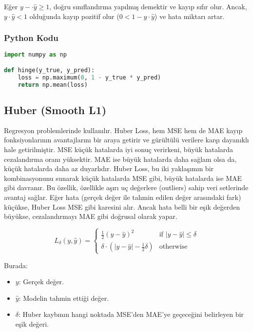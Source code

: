 Eğer $y - \cdot \hat{y} \geq 1$, doğru sınıflandırma yapılmış demektir ve kayıp sıfır olur. Ancak, $y \cdot \hat{y} < 1$ olduğunda kayıp pozitif olur ($0 < 1 - y \cdot \hat{y}$) ve hata miktarı artar.

\subsubsection{Python Kodu}

\begin{lstlisting}[language=Python]
import numpy as np

def hinge(y_true, y_pred):
    loss = np.maximum(0, 1 - y_true * y_pred)
    return np.mean(loss)
\end{lstlisting}

\newpage

\subsection{Huber (Smooth L1)}

Regresyon problemlerinde kullanılır. Huber Loss, hem MSE hem de MAE kayıp fonksiyonlarının avantajlarını bir araya getirir ve gürültülü verilere karşı dayanıklı hale getirilmiştir. MSE küçük hatalarda iyi sonuç verirkeni, büyük hatalarda cezalandırma oranı yüksektir. MAE ise büyük hatalarda daha sağlam olsa da, küçük hatalarda daha az duyarlıdır. Huber Loss, bu iki yaklaşımın bir kombinasyonunu sunarak küçük hatalarda MSE gibi, büyük hatalarda ise MAE gibi davranır. Bu özellik, özellikle aşırı uç değerlere (outliers) sahip veri setlerinde avantaj sağlar. Eğer hata (gerçek değer ile tahmin edilen değer arasındaki fark) küçükse, Huber Loss MSE gibi karesini alır. Ancak hata belli bir eşik değerden büyükse, cezalandırmayı MAE gibi doğrusal olarak yapar.

\[
L_{\delta}(y, \hat{y}) =
\begin{cases}
    \frac{1}{2} (y - \hat{y})^2 & \text{if } |y - \hat{y}| \leq \delta \\ 
    \delta \cdot (|y - \hat{y}| - \frac{1}{2} \delta) & \text{otherwise}
\end{cases}
\]

Burada:

\begin{itemize}
    \item $y$: Gerçek değer.
    \item $\hat{y}$: Modelin tahmin ettiği değer.
    \item $\delta$: Huber kaybının hangi noktada MSE'den MAE'ye geçeceğini belirleyen bir eşik değeri.
\end{itemize}

